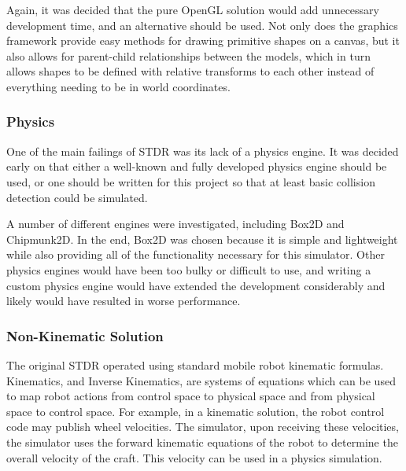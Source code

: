  	Again, it was decided that the pure OpenGL solution would add unnecessary development time, and an alternative should be used. Not only does the graphics framework provide easy methods for drawing primitive shapes on a canvas, but it also allows for parent-child relationships between the models, which in turn allows shapes to be defined with relative transforms to each other instead of everything needing to be in world coordinates.
 	
 	\subsubsection*{Physics}
 	One of the main failings of STDR was its lack of a physics engine. It was decided early on that either a well-known and fully developed physics engine should be used, or one should be written for this project so that at least basic collision detection could be simulated.
 	
 	A number of different engines were investigated, including Box2D and Chipmunk2D. In the end, Box2D was chosen because it is simple and lightweight while also providing all of the functionality necessary for this simulator. Other physics engines would have been too bulky or difficult to use, and writing a custom physics engine would have extended the development considerably and likely would have resulted in worse performance.

	\subsubsection*{Non-Kinematic Solution}
	The original STDR operated using standard mobile robot kinematic formulas. Kinematics, and Inverse Kinematics, are systems of equations which can be used to map robot actions from control space to physical space and from physical space to control space. For example, in a kinematic solution, the robot control code may publish wheel velocities. The simulator, upon receiving these velocities, the simulator uses the forward kinematic equations of the robot to determine the overall velocity of the craft. This velocity can be used in a physics simulation.
	
